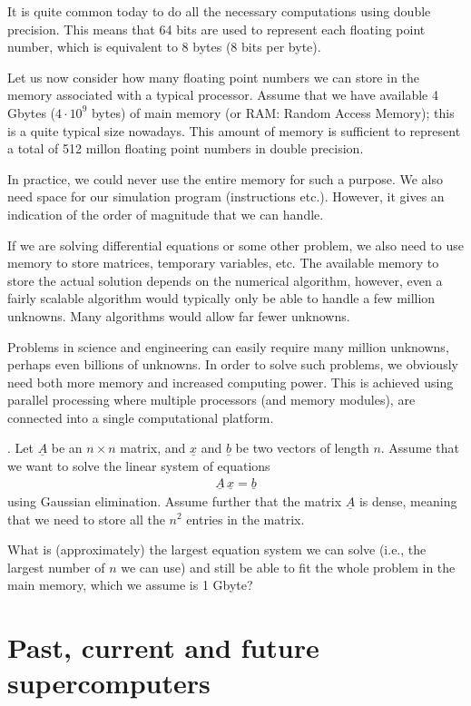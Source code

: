 It is quite common today to do all the necessary computations using double
precision. This means that 64 bits are used to represent each floating point
number, which is equivalent to 8 bytes (8 bits per byte).

Let us now consider how many floating point numbers we can store in the memory
associated with a typical processor. Assume that we have available 4 Gbytes
($4\cdot 10^9$ bytes) of main memory (or RAM: Random Access Memory); this is a
quite typical size nowadays. This amount of memory is sufficient to represent a
total of 512 millon floating point numbers in double precision.

In practice, we could never use the entire memory for such a purpose. We also
need space for our simulation program (instructions etc.). However, it gives an
indication of the order of magnitude that we can handle.

If we are solving differential equations or some other problem, we also need to
use memory to store matrices, temporary variables, etc. The available memory to
store the actual solution depends on the numerical algorithm, however, even a
fairly scalable algorithm would typically only be able to handle a few million
unknowns. Many algorithms would allow far fewer unknowns.

Problems in science and engineering can easily require many million unknowns,
perhaps even billions of unknowns. In order to solve such problems, we obviously
need both more memory and increased computing power. This is achieved using
parallel processing where multiple processors (and memory modules), are
connected into a single computational platform.

. Let $\underline{A}$ be an $n\times n$ matrix,
and $\underline{x}$ and $\underline{b}$ be two vectors of length $n$. Assume
that we want to solve the linear system of equations
\begin{align}
  \underline{A}\,\underline{x} = \underline{b}
\end{align}
using Gaussian elimination. Assume further that the matrix $\underline{A}$ is
dense, meaning that we need to store all the $n^2$ entries in the matrix.

What is (approximately) the largest equation system we can solve (i.e., the
largest number of $n$ we can use) and still be able to fit the whole problem in
the main memory, which we assume is 1 Gbyte?

\section{Past, current and future supercomputers}

